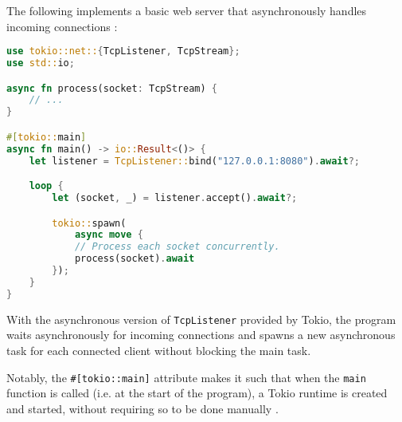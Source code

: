 \documentclass[a4paper,UKenglish,cleveref, autoref, thm-restate]{lipics-v2021}
\begin{document}
The following implements a basic web server that asynchronously handles incoming connections \cite{spawnint88:online}:

\begin{minipage}{\linewidth}
\begin{lstlisting}[language=Rust,caption={A basic async webserver},captionpos=t]
use tokio::net::{TcpListener, TcpStream};
use std::io;

async fn process(socket: TcpStream) {
    // ...
}

#[tokio::main]
async fn main() -> io::Result<()> {
    let listener = TcpListener::bind("127.0.0.1:8080").await?;

    loop {
        let (socket, _) = listener.accept().await?;

        tokio::spawn(
            async move {
            // Process each socket concurrently.
            process(socket).await
        });
    }
}
\end{lstlisting}
\end{minipage}

With the asynchronous version of \verb|TcpListener| provided by Tokio, the program waits asynchronously for incoming connections and spawns a new asynchronous task for each connected client without blocking the main task.

Notably, the \verb|#[tokio::main]| attribute makes it such that when the \verb|main| function is called (i.e. at the start of the program), a Tokio runtime is created and started, without requiring so to be done manually \cite{maininto61:online}.


%
%




\appendix
\end{document}
